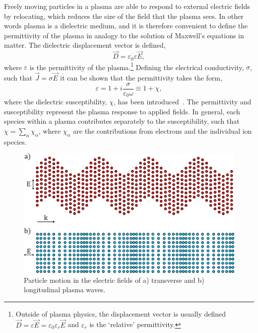 Freely moving particles in a plasma are able to respond to external electric fields by relocating, which reduces the size of the field that the plasma sees.
In other words plasma is a dielectric medium, and it is therefore convenient to define the permittivity of the plasma in analogy to the solution of Maxwell's equations in matter.
The dielectric displacement vector is defined,
\begin{equation}
    \vec{D} = \varepsilon_0 \varepsilon \vec{E},
\end{equation}
where $\varepsilon$ is the permittivity of the plasma.\footnote{Outside of plasma physics, the displacement vector is usually defined $\vec{D} = \varepsilon\vec{E} = \varepsilon_0 \varepsilon_{r}\vec{E}$ and $\varepsilon_r$ is the `relative' permittivity.}
Defining the electrical conductivity, $\sigma$, such that $\vec{J}=\sigma\vec{E}$ it can be shown that the permittivity takes the form,
\begin{equation}
    \label{eq:theory_perm_def}
    \varepsilon = 1 + i\frac{\sigma}{\varepsilon_0\omega} \equiv 1 + \chi,
\end{equation}
where the dielectric susceptibility, $\chi$, has been introduced~\cite{michel_introduction_2023}.
The permittivity and susceptibility represent the plasma response to applied fields.
In general, each species within a plasma contributes separately to the susceptibility, such that $\chi = \sum\nolimits_\alpha \chi_\alpha$, where $\chi_\alpha$ are the contributions from electrons and the individual ion species.

\begin{figure}[t!]
    \includegraphics[width=0.75\linewidth]{Theory/Images/plasma_waves.png}
    \centering
    \caption{Particle motion in the electric fields of a) transverse and b) longitudinal plasma waves.}%
    \label{fig:theory_plasma_waves}
\end{figure}


